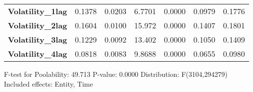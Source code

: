 \begin{center}
\begin{tabular}{lcccccc}
\textbf{Volatility\_1lag}               &       0.1378       &       0.0203       &      6.7701     &      0.0000      &       0.0979      &       0.1776       \\
\textbf{Volatility\_2lag}               &       0.1604       &       0.0100       &      15.972     &      0.0000      &       0.1407      &       0.1801       \\
\textbf{Volatility\_3lag}               &       0.1229       &       0.0092       &      13.402     &      0.0000      &       0.1050      &       0.1409       \\
\textbf{Volatility\_4lag}               &       0.0818       &       0.0083       &      9.8688     &      0.0000      &       0.0655      &       0.0980       \\
\bottomrule
\end{tabular}
\end{center}

F-test for Poolability: 49.713 \newline
 P-value: 0.0000 \newline
 Distribution: F(3104,294279) \newline
  \newline
 Included effects: Entity, Time